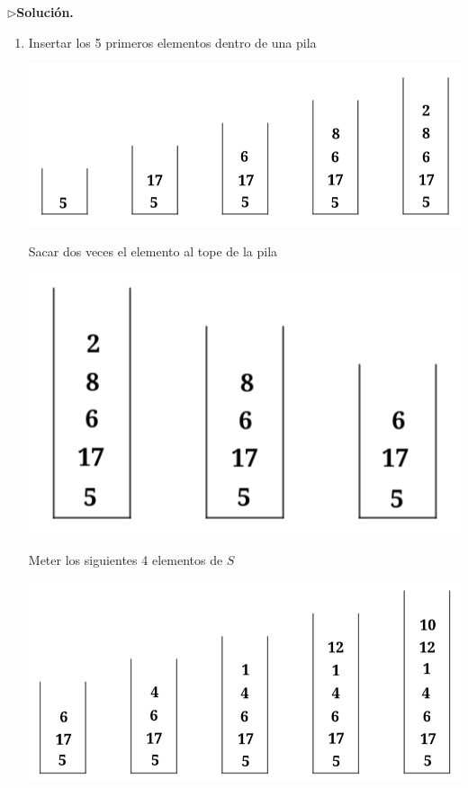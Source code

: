 $\rhd$\textbf{Solución.}
    \begin{enumerate}
    \item Insertar los 5 primeros elementos dentro de una pila
       \begin{center}
          \includegraphics[scale=0.3]{../Image/P1.png}
       \end{center}
       Sacar dos veces el elemento al tope de la pila
       \begin{center}
          \includegraphics[scale=0.3]{../Image/P2.png}
       \end{center}
       Meter los siguientes 4 elementos de $S$
       \begin{center}
          \includegraphics[scale=0.3]{../Image/P3.png}

\end{center}
\end{enumerate}
